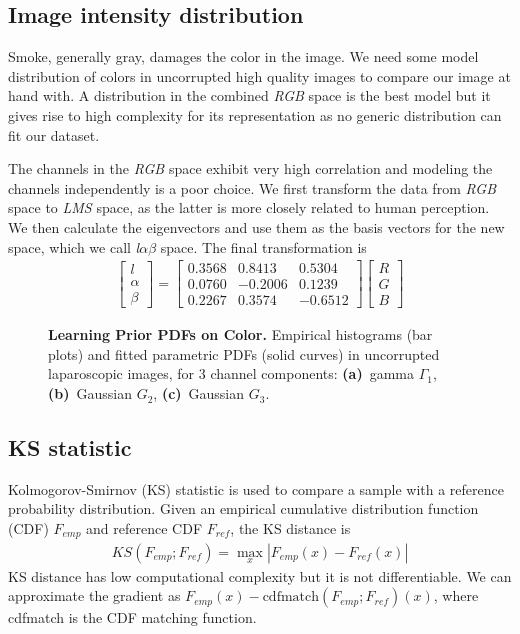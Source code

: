 \subsection{Image intensity distribution}
Smoke, generally gray, damages the color in the image. We need some model distribution of colors in uncorrupted high quality images to compare our image at hand with. A distribution in the combined \textit{RGB} space is the best model but it gives rise to high complexity for its representation as no generic distribution can fit our dataset.

The channels in the \textit{RGB} space exhibit very high correlation and modeling the channels independently is a poor choice. We first transform the data from \textit{RGB} space to \textit{LMS} space, as the latter is more closely related to human perception. We then calculate the eigenvectors and use them as the basis vectors for the new space, which we call \textit{l$\alpha\beta$} space. The final transformation is 
\begin{align}
    \begin{bmatrix}
    l \\ \alpha \\ \beta
    \end{bmatrix}
    = 
    \begin{bmatrix}
    0.3568 & 0.8413 & 0.5304 \\
    0.0760 & -0.2006 & 0.1239 \\
    0.2267 & 0.3574 & -0.6512  
    \end{bmatrix}
    \begin{bmatrix}
    R \\ G \\ B
    \end{bmatrix}
\end{align}

\begin{figure}[!t]
    \caption
    {
        {\bf Learning Prior PDFs on Color.}
        Empirical histograms (bar plots) and fitted parametric PDFs (solid curves) in uncorrupted laparoscopic images, for 3 channel components: {\bf
            (a)}~gamma $\Gamma_1$, {\bf (b)}~Gaussian $G_2$, {\bf (c)}~Gaussian $G_3$.
    }
    \label{fig:intensity_dist}
\end{figure}


\subsection{KS statistic}
Kolmogorov-Smirnov (KS) statistic is used to compare a sample with a reference probability distribution. Given an empirical cumulative distribution function (CDF) $F_{emp}$ and reference CDF $F_{ref}$, the KS distance is
\begin{align}
    KS(F_{emp}; F_{ref}) = \max_{x} | F_{emp}(x) - F_{ref}(x) | \label{eqn:ks_distance}
\end{align}
KS distance has low computational complexity but it is not differentiable. We can approximate the gradient as $F_{emp}(x) - \text{cdfmatch}(F_{emp}; F_{ref})(x)$, where cdfmatch is the CDF matching function.

